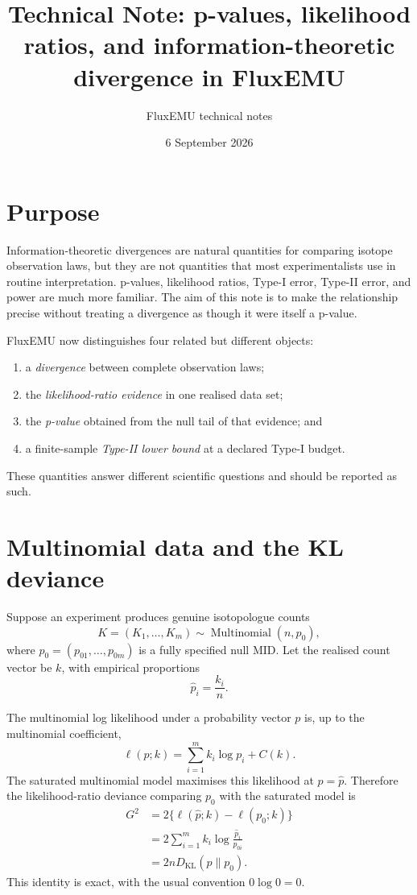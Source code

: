 \documentclass[11pt]{article}
\title{Technical Note: p-values, likelihood ratios, and information-theoretic divergence in FluxEMU}
\author{FluxEMU technical notes}
\date{6 September 2026}
\newcommand{\KL}{D_{\mathrm{KL}}}
\begin{document}
\maketitle

\section{Purpose}

Information-theoretic divergences are natural quantities for comparing isotope
observation laws, but they are not quantities that most experimentalists use in
routine interpretation. p-values, likelihood ratios, Type-I error, Type-II
error, and power are much more familiar. The aim of this note is to make the
relationship precise without treating a divergence as though it were itself a
p-value.

FluxEMU now distinguishes four related but different objects:
\begin{enumerate}
    \item a \emph{divergence} between complete observation laws;
    \item the \emph{likelihood-ratio evidence} in one realised data set;
    \item the \emph{p-value} obtained from the null tail of that evidence; and
    \item a finite-sample \emph{Type-II lower bound} at a declared Type-I budget.
\end{enumerate}

These quantities answer different scientific questions and should be reported
as such.

\section{Multinomial data and the KL deviance}

Suppose an experiment produces genuine isotopologue counts
\begin{equation}
K=(K_1,\ldots,K_m)\sim \operatorname{Multinomial}(n,p_0),
\end{equation}
where $p_0=(p_{01},\ldots,p_{0m})$ is a fully specified null MID. Let the
realised count vector be $k$, with empirical proportions
\begin{equation}
\widehat p_i=\frac{k_i}{n}.
\end{equation}

The multinomial log likelihood under a probability vector $p$ is, up to the
multinomial coefficient,
\begin{equation}
\ell(p;k)=\sum_{i=1}^m k_i\log p_i + C(k).
\end{equation}
The saturated multinomial model maximises this likelihood at
$p=\widehat p$. Therefore the likelihood-ratio deviance comparing $p_0$ with
the saturated model is
\begin{align}
G^2
&=2\{\ell(\widehat p;k)-\ell(p_0;k)\}\\
&=2\sum_{i=1}^m k_i\log\frac{\widehat p_i}{p_{0i}}\\
&=2n\KL(\widehat p\|p_0).
\end{align}
This identity is exact, with the usual convention $0\log 0=0$.
\end{document}
